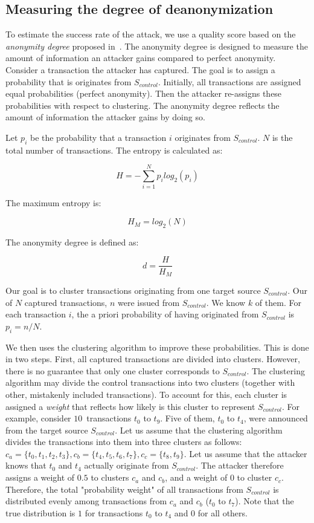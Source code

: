 \subsection{Measuring the degree of deanonymization}

To estimate the success rate of the attack, we use a quality score based on the \textit{anonymity degree} proposed in~\cite{Diaz2002}.
The anonymity degree is designed to measure the amount of information an attacker gains compared to perfect anonymity.
Consider a transaction the attacker has captured.
The goal is to assign a probability that is originates from $S_{control}$.
Initially, all transactions are assigned equal probabilities (perfect anonymity).
Then the attacker re-assigns these probabilities with respect to clustering.
The anonymity degree reflects the amount of information the attacker gains by doing so.

Let $p_i$ be the probability that a transaction $i$ originates from $S_{control}$.
$N$ is the total number of transactions.
The entropy is calculated as:

\[
H = -\sum_{i=1}^N p_i log_2(p_i)
\]

The maximum entropy is:

\[
H_M = log_2(N)
\]

The anonymity degree is defined as:

\[
d = \frac{H}{H_M}
\]


Our goal is to cluster transactions originating from one target source $S_{control}$.
Our of $N$ captured transactions, $n$ were issued from $S_{control}$.
We know $k$ of them.
For each transaction $i$, the a priori probability of having originated from $S_{control}$ is $p_i = n / N$.

We then uses the clustering algorithm to improve these probabilities.
This is done in two steps.
First, all captured transactions are divided into clusters.
However, there is no guarantee that only one cluster corresponds to $S_{control}$.
The clustering algorithm may divide the control transactions into two clusters (together with other, mistakenly included transactions).
To account for this, each cluster is assigned a \textit{weight} that reflects how likely is this cluster to represent $S_{control}$.
For example, consider $10$~transactions $t_0$ to $t_9$.
Five of them, $t_0$ to $t_4$, were announced from the target source $S_{control}$.
Let us assume that the clustering algorithm divides the transactions into them into three clusters as follows: $c_a = \{t_0, t_1, t_2, t_3\}, c_b = \{t_4, t_5, t_6, t_7\}, c_c = \{t_8, t_9\}$.
Let us assume that the attacker knows that $t_0$ and $t_4$ actually originate from $S_{control}$.
The attacker therefore assigns a weight of $0.5$ to clusters $c_a$ and $c_b$, and a weight of $0$ to cluster $c_c$.
Therefore, the total "probability weight" of all transactions from $S_{control}$ is distributed evenly among transactions from $c_a$ and $c_b$ ($t_0$ to $t_7$).
Note that the true distribution is $1$ for transactions $t_0$ to $t_4$ and $0$ for all others.

